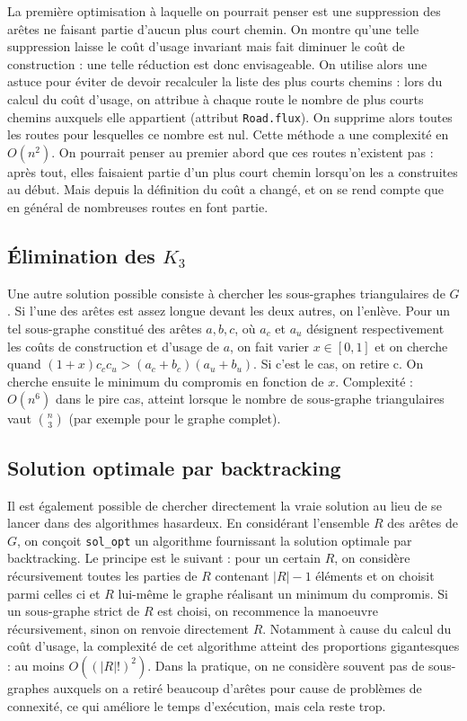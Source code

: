 \documentclass[french]{article}
\begin{document}
				La première optimisation à laquelle on pourrait penser est une suppression des arêtes ne faisant partie d'aucun plus court chemin. On montre qu'une telle suppression laisse le coût d'usage invariant mais fait diminuer le coût de construction : une telle réduction est donc envisageable. \newline
				On utilise alors une astuce pour éviter de devoir recalculer la liste des plus courts chemins : lors du calcul du coût d'usage, on attribue à chaque route le nombre de plus courts chemins auxquels elle appartient (attribut \verb?Road.flux?). On supprime alors toutes les routes pour lesquelles ce nombre est nul. Cette méthode a une complexité en $O(n^{2})$. \newline
				On pourrait penser au premier abord que ces routes n'existent pas : après tout, elles faisaient partie d'un plus court chemin lorsqu'on les a construites au début. Mais depuis la définition du coût a changé, et on se rend compte que en général de nombreuses routes en font partie.

			\subsection{Élimination des $K_{3}$}

				Une autre solution possible consiste à chercher les sous-graphes triangulaires de $G$. Si l'une des arêtes est assez longue devant les deux autres, on l'enlève. Pour un tel sous-graphe constitué des arêtes $a,b,c$, où $a_{c}$ et $a_{u}$ désignent respectivement les coûts de construction et d'usage de $a$, on fait varier $x \in [0,1]$ et on cherche quand  $(1+x) c_{c} c_{u} > (a_{c} + b_{c})(a_{u} + b_{u})$. Si c'est le cas, on retire c. On cherche ensuite le minimum du compromis en fonction de $x$. Complexité : $O(n^{6})$ dans le pire cas, atteint lorsque le nombre de sous-graphe triangulaires vaut $\binom{n}{3}$ (par exemple pour le graphe complet).
			\subsection{Solution optimale par backtracking}

				Il est également possible de chercher directement la vraie solution au lieu de se lancer dans des algorithmes hasardeux. En considérant l'ensemble $R$ des arêtes de $G$, on conçoit \verb?sol_opt? un algorithme fournissant la solution optimale par backtracking. Le principe est le suivant : pour un certain $R$, on considère récursivement toutes les parties de $R$ contenant $|R|-1$ éléments et on choisit parmi celles ci et $R$ lui-même le graphe réalisant un minimum du compromis. Si un sous-graphe strict de $R$ est choisi, on recommence la manoeuvre récursivement, sinon on renvoie directement $R$. Notamment à cause du calcul du coût d'usage, la complexité de cet algorithme atteint des proportions gigantesques : au moins $O((|R|!)^{2})$. Dans la pratique, on ne considère souvent pas de sous-graphes auxquels on a retiré beaucoup d'arêtes pour cause de problèmes de connexité, ce qui améliore le temps d'exécution, mais cela reste trop.
\end{document}
